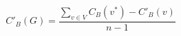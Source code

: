 \documentclass[12pt]{article}
\begin{document}
\[
C'_B\left(G\right) = \frac
    {\sum_{v \in V}{C_B\left(v^{*}\right) - C'_B\left(v\right)}}
    {n - 1}
\]
\end{document}
